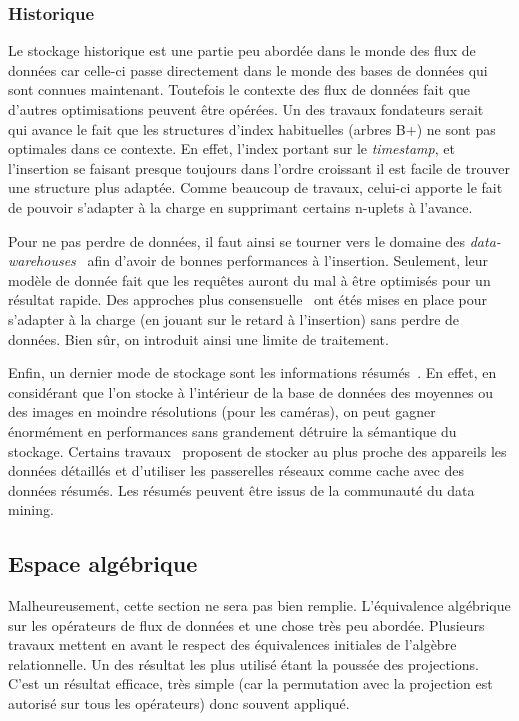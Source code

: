\subsubsection{Historique}
Le stockage historique est une partie peu abordée dans le monde des flux de données car celle-ci passe directement dans le monde des bases de données qui sont connues maintenant. Toutefois le contexte des flux de données fait que d'autres optimisations peuvent être opérées. Un des travaux fondateurs serait~\cite{Chandrasekaran:oscar} qui avance le fait que les structures d'index habituelles (arbres B+) ne sont pas optimales dans ce contexte. En effet, l'index portant sur le \textit{timestamp}, et l'insertion se faisant presque toujours dans l'ordre croissant il est facile de trouver une structure plus adaptée. Comme beaucoup de travaux, celui-ci apporte le fait de pouvoir s'adapter à la charge en supprimant certains n-uplets à l'avance.

Pour ne pas perdre de données, il faut ainsi se tourner vers le domaine des \textit{data-warehouses}~\cite{Chaudhuri:warehouse} afin d'avoir de bonnes performances à l'insertion. Seulement, leur modèle de donnée fait que les requêtes auront du mal à être optimisés pour un résultat rapide. Des approches plus consensuelle~\cite{Petit:historical} ont étés mises en place pour s'adapter à la charge (en jouant sur le retard à l'insertion) sans perdre de données. Bien sûr, on introduit ainsi une limite de traitement. 

Enfin, un dernier mode de stockage sont les informations résumés~\cite{Diao:stonedb}. En effet, en considérant que l'on stocke à l'intérieur de la base de données des moyennes ou des images en moindre résolutions (pour les caméras), on peut gagner énormément en performances sans grandement détruire la sémantique du stockage. Certains travaux~\cite{Diao:stonedb} proposent de stocker au plus proche des appareils les données détaillés et d'utiliser les passerelles réseaux comme cache avec des données résumés. Les résumés peuvent être issus de la communauté du data mining. 

\subsection{Espace algébrique}
Malheureusement, cette section ne sera pas bien remplie. L'équivalence algébrique sur les opérateurs de flux de données et une chose très peu abordée. Plusieurs travaux mettent en avant le respect des équivalences initiales de l'algèbre relationnelle. Un des résultat les plus utilisé étant la poussée des projections. C'est un résultat efficace, très simple (car la permutation avec la projection est autorisé sur tous les opérateurs) donc souvent appliqué. 

